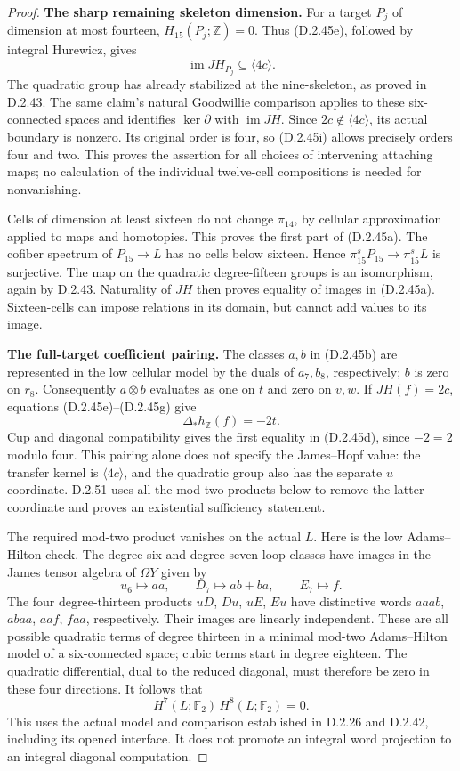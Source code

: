 \begin{proof}
\medskip\noindent
\textbf{The sharp remaining skeleton dimension.}
For a target $P_j$ of dimension at most fourteen,
$H_{15}(P_j;\mathbb Z)=0$.  Thus (D.2.45e), followed by
integral Hurewicz, gives
\[
             \operatorname{im}JH_{P_j}\subseteq\langle4c\rangle.
 \tag{D.2.45i}
\]
The quadratic group has already stabilized at the
nine-skeleton, as proved in D.2.43.  The same claim's
natural Goodwillie comparison applies to these six-connected
spaces and identifies $\ker\partial$ with
$\operatorname{im}JH$.  Since $2c\notin\langle4c\rangle$,
its actual boundary is nonzero.  Its original order is four,
so (D.2.45i) allows precisely orders four and two.  This proves
the assertion for all choices of intervening attaching maps;
no calculation of the individual twelve-cell compositions
is needed for nonvanishing.

Cells of dimension at least sixteen do not change
$\pi_{14}$, by cellular approximation applied to maps and
homotopies.  This proves the first part of (D.2.45a).
The cofiber spectrum of $P_{15}\to L$ has no cells below
sixteen.  Hence $\pi_{15}^sP_{15}\to\pi_{15}^sL$ is
surjective.  The map on the quadratic degree-fifteen groups
is an isomorphism, again by D.2.43.  Naturality of $JH$
then proves equality of images in (D.2.45a).  Sixteen-cells
can impose relations in its domain, but cannot add values
to its image.

\medskip\noindent
\textbf{The full-target coefficient pairing.}
The classes $a,b$ in (D.2.45b) are represented in the low
cellular model by the duals of $a_7,b_8$, respectively;
$b$ is zero on $r_8$.  Consequently $a\otimes b$ evaluates
as one on $t$ and zero on $v,w$.  If $JH(f)=2c$, equations
(D.2.45e)--(D.2.45g) give
\[
                  \Delta_*h_{\mathbb Z}(f)=-2t.
\]
Cup and diagonal compatibility gives the first equality
in (D.2.45d), since $-2=2$ modulo four. This pairing alone does
not specify the James--Hopf value: the transfer kernel is
$\langle4c\rangle$, and the quadratic group also has the separate
$u$ coordinate. D.2.51 uses all the mod-two products below to
remove the latter coordinate and proves an existential
sufficiency statement.

The required mod-two product vanishes on the actual $L$.
Here is the low Adams--Hilton check.  The degree-six and
degree-seven loop classes have images in the James tensor
algebra of $\Omega Y$ given by
\[
 u_6\longmapsto aa,\qquad D_7\longmapsto ab+ba,
                   \qquad E_7\longmapsto f.
\]
The four degree-thirteen products $uD$, $Du$, $uE$, $Eu$
have distinctive words $aaab$, $abaa$, $aaf$, $faa$,
respectively.  Their images are
linearly independent.  These are all possible quadratic
terms of degree thirteen in a minimal mod-two
Adams--Hilton model of a six-connected space; cubic terms
start in degree eighteen.  The quadratic differential,
dual to the reduced diagonal, must therefore be zero in
these four directions.  It follows that
\[
       H^7(L;\mathbb F_2)\,H^8(L;\mathbb F_2)=0.
 \tag{D.2.45j}
\]
This uses the actual model and comparison established in
D.2.26 and D.2.42, including its opened
\cite[\S3.1, p.~300]{FGHHalperinLemaire1995} interface.
It does not promote an integral word projection to an
integral diagonal computation.


\end{proof}
